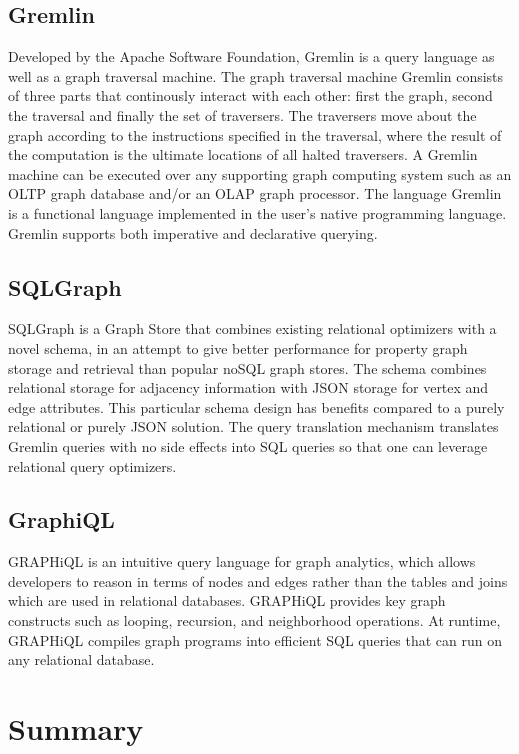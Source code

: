 \documentclass[11pt,singlecolumn]{scrartcl}
\begin{document}
\subsection{Gremlin}
Developed by the Apache Software Foundation, Gremlin is a query language as well as a graph traversal machine. The graph traversal machine Gremlin consists of three parts that continously interact with each other: first the graph, second the traversal and finally the set of traversers. The traversers move about the graph according to the instructions specified in the traversal, where the result of the computation is the ultimate locations of all halted traversers. A Gremlin machine can be executed over any supporting graph computing system such as an OLTP graph database and/or an OLAP graph processor. The language Gremlin is a functional language implemented in the user’s native programming language. Gremlin supports both imperative and declarative querying.
\cite{Gremlin}


\subsection{SQLGraph}
SQLGraph is a Graph Store that combines existing relational optimizers with a novel schema, in an attempt to give better performance for property graph storage and retrieval than popular noSQL graph stores. The schema combines relational storage for adjacency information with JSON storage for vertex and edge attributes. This particular schema design has benefits compared to a purely relational or purely JSON solution. The query translation mechanism translates Gremlin queries with no side effects into SQL queries so that one can leverage relational query optimizers. \cite{Sun:2015}


\subsection{GraphiQL}
GRAPHiQL is an intuitive query language for graph analytics, which allows developers to reason in terms of nodes and edges rather than the tables and joins which are used in relational databases. GRAPHiQL provides key graph constructs such as looping, recursion, and neighborhood operations. At runtime, GRAPHiQL compiles graph programs into efficient SQL queries that can run on any relational database. \cite {Graphiql}
\clearpage

\section{Summary}
\end{document}
